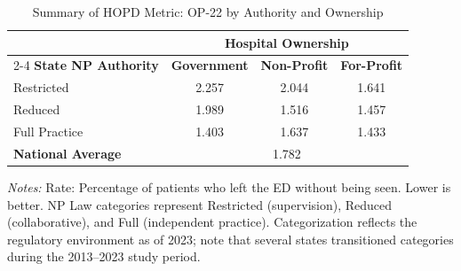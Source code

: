 \begin{table}[htbp]
    \centering
    \caption{Summary of HOPD Metric: OP-22 by Authority and Ownership}
    \label{tab:hopd_op_22}
    \vspace{0.2cm}
    \begin{tabular}{lccc}
        \toprule
        & \multicolumn{3}{c}{\textbf{Hospital Ownership}} \\
        \cmidrule(lr){2-4}
        \textbf{State NP Authority} & \textbf{Government} & \textbf{Non-Profit} & \textbf{For-Profit} \\
        \midrule
        Restricted & 2.257 & 2.044 & 1.641 \\
        Reduced & 1.989 & 1.516 & 1.457 \\
        Full Practice & 1.403 & 1.637 & 1.433 \\
        \midrule
        \textbf{National Average} & \multicolumn{3}{c}{1.782} \\
        \bottomrule
    \end{tabular}
    \vspace{0.1cm}
    \begin{minipage}{0.85\textwidth}
        \footnotesize \textit{Notes:} Rate: Percentage of patients who left the ED without being seen. Lower is better. NP Law categories represent Restricted (supervision), Reduced (collaborative), and Full (independent practice). Categorization reflects the regulatory environment as of 2023; note that several states transitioned categories during the 2013--2023 study period.
    \end{minipage}
\end{table}